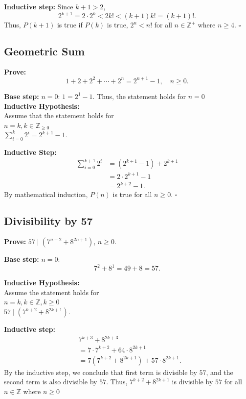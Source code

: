 \textbf{Inductive step:} Since $k+1>2$,
\[
2^{k+1}=2\cdot2^k
<2k!<(k+1)k!=(k+1)!.
\]
Thus, $P(k+1)$ is true if $P(k)$ is true, $2^n < n!$ for all $n\in\mathbb{Z}^{+}$ where $n\geq4$. $\square$

\subsection{Geometric Sum}
\textbf{Prove:}
\[
1+2+2^2+\cdots+2^n=2^{n+1}-1,
\quad n\geq0.
\]

\textbf{Base step:} $n=0$: $1=2^1-1$.
Thus, the statement holds for $n=0$ \\
\textbf{Inductive Hypothesis:} \\
Assume that the statement holds for \\ $n=k,k\in\mathbb{Z}_{\geq0}$ \\
$\sum_{i=0}^{k}2^i=2^{k+1}-1$.

\textbf{Inductive Step:}
\[
\begin{aligned}
\sum_{i=0}^{k+1}2^i
&=(2^{k+1}-1)+2^{k+1}\\
&=2\cdot2^{k+1}-1\\
&=2^{k+2}-1.
\end{aligned}
\]
By mathematical induction, $P(n)$ is true for all $n\geq0$. $\square$

\subsection{Divisibility by 57}
\textbf{Prove:}
$57\mid(7^{n+2}+8^{2n+1})$, $n\geq0$.

\textbf{Base step:} $n=0$:
\[
7^2+8^1=49+8=57.
\]

\textbf{Inductive Hypothesis:} \\
Assume the statement holds for \\ $n=k,k\in\mathbb{Z},k\geq0$ \\
$57\mid(7^{k+2}+8^{2k+1})$.

\textbf{Inductive step:}
\[
\begin{aligned}
&7^{k+3}+8^{2k+3}\\
&=7\cdot7^{k+2}+64\cdot8^{2k+1}\\
&=7(7^{k+2}+8^{2k+1})
  +57\cdot8^{2k+1}.
\end{aligned}
\]
By the inductive step, we conclude that first term is divisible by $57$,
and the second term is also divisible by $57$.
Thus, $7^{k+2}+8^{2k+1}$ is divisible by $57$ for all $n\in\mathbb{Z}$ where $n\geq0$